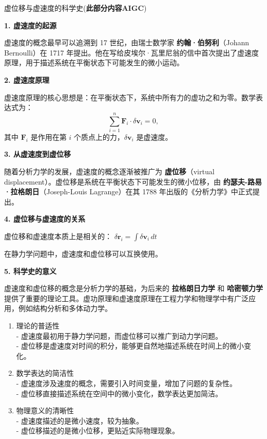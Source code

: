 \documentclass[12pt, a4paper, oneside, UTF8]{ctexbook}  %
\begin{document}
\begin{add}
虚位移与虚速度的科学史(\textbf{此部分内容AIGC})

\noindent \textbf{1. 虚速度的起源} 

虚速度的概念最早可以追溯到 17 世纪，由瑞士数学家 \textbf{约翰·伯努利}（Johann Bernoulli）在 1717 年提出。他在写给皮埃尔·瓦里尼翁的信中首次提出了虚速度原理，用于描述系统在平衡状态下可能发生的微小运动。

\noindent \textbf{2. 虚速度原理} 

虚速度原理的核心思想是：在平衡状态下，系统中所有力的虚功之和为零。数学表达式为：
\[
\sum_{i=1}^n \mathbf{F}_i \cdot \delta \mathbf{v}_i = 0,
\]
其中 \( \mathbf{F}_i \) 是作用在第 \( i \) 个质点上的力，\( \delta \mathbf{v}_i \) 是虚速度。

\noindent \textbf{3. 从虚速度到虚位移} 

随着分析力学的发展，虚速度的概念逐渐被推广为 \textbf{虚位移}（virtual displacement）。虚位移是系统在平衡状态下可能发生的微小位移，由 \textbf{约瑟夫-路易·拉格朗日}（Joseph-Louis Lagrange）在其 1788 年出版的《分析力学》中正式提出。

\noindent \textbf{4. 虚位移与虚速度的关系} 

虚位移和虚速度本质上是相关的：
\(\displaystyle \delta \mathbf{r}_i = \int \delta \mathbf{v}_i \, dt\)

在静力学问题中，虚速度和虚位移可以互换使用。

\noindent \textbf{5. 科学史的意义} 

虚速度和虚位移的概念是分析力学的基础，为后来的 \textbf{拉格朗日力学} 和 \textbf{哈密顿力学} 提供了重要的理论工具。虚功原理和虚速度原理在工程力学和物理学中有广泛应用，例如结构分析和多体动力学。

\begin{enumerate}
\item 理论的普适性 \\
- 虚速度最初用于静力学问题，而虚位移可以推广到动力学问题。 \\
- 虚位移是虚速度对时间的积分，能够更自然地描述系统在时间上的微小变化。

\item 数学表达的简洁性 \\
- 虚速度涉及速度的概念，需要引入时间变量，增加了问题的复杂性。 \\
- 虚位移直接描述系统在空间中的微小变化，数学表达更加简洁。

\item 物理意义的清晰性 \\
- 虚速度描述的是微小速度，较为抽象。 \\
- 虚位移描述的是微小位移，更贴近实际物理现象。
\end{enumerate}
\end{add}
\end{document}
